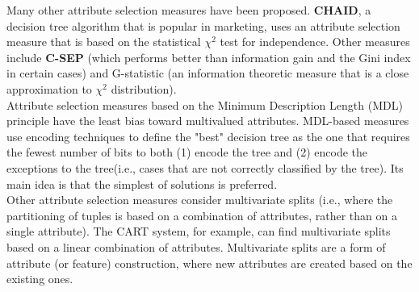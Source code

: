 Many other attribute selection measures have been proposed.\textbf{ CHAID}, a decision tree algorithm that is popular
in marketing, uses an attribute selection measure that is based on the statistical $\chi^{2} $ test for independence. Other measures include \textbf{C-SEP} (which performs better than information gain and the Gini index in certain cases) and G-statistic (an information theoretic measure that is a close approximation to $\chi^{2} $ distribution).
\\
Attribute selection measures based on the Minimum Description Length (MDL) principle have the least bias
toward multivalued attributes. MDL-based measures use encoding techniques to define the "best" decision tree
as the one that requires the fewest number of bits to both (1) encode the tree and (2) encode the exceptions to
the tree(i.e., cases that are not correctly classified by the tree). Its main idea is that the simplest of solutions is preferred. \\
Other attribute selection measures consider multivariate splits (i.e., where the partitioning of tuples is based
on a combination of attributes, rather than on a single attribute). The CART system, for example, can find
multivariate splits based on a linear combination of attributes. Multivariate splits are a form of attribute (or
feature) construction, where new attributes are created based on the existing ones.\cite{Data Mining Concepts and Techniques}

